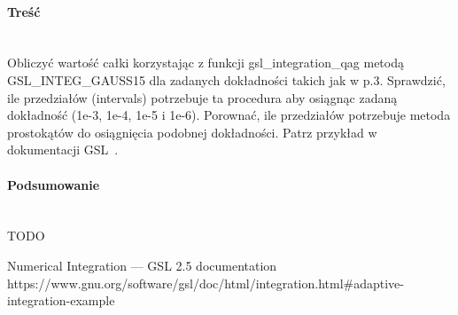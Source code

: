 \paragraph{Treść}~\\
Obliczyć wartość całki korzystając z funkcji gsl\_integration\_qag metodą GSL\_INTEG\_GAUSS15 dla zadanych dokładności takich jak w p.3.
Sprawdzić, ile przedziałów (intervals) potrzebuje ta procedura aby osiągnąc zadaną dokładność (1e-3, 1e-4, 1e-5 i 1e-6).
Porownać, ile przedziałów potrzebuje metoda prostokątów do osiągnięcia podobnej dokładności.
Patrz przykład w dokumentacji GSL~\cite{NumericalIntegrationGSL25Documentation}.



\paragraph{Podsumowanie}~\\
TODO

\begin{thebibliography}{9}
   Numerical Integration — GSL 2.5 documentation https://www.gnu.org/software/gsl/doc/html/integration.html\#adaptive-integration-example
\end{thebibliography}
